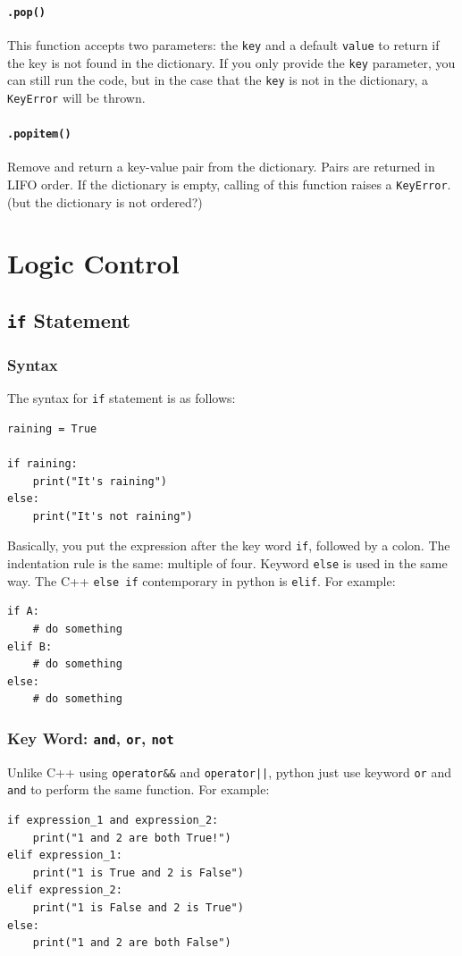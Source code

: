 \documentclass[12pt]{book}
\begin{document}
\subsubsection{\texttt{.pop()}}
\label{sec:orgbbf2fce}
This function accepts two parameters: the \texttt{key} and a default \texttt{value} to return if the key is not found in the dictionary. If you only provide the \texttt{key} parameter, you can still run the code, but in the case that the \texttt{key} is not in the dictionary, a \texttt{KeyError} will be thrown.
\subsubsection{\texttt{.popitem()}}
\label{sec:orgb8b19f4}
Remove and return a key-value pair from the dictionary. Pairs are returned in LIFO order. If the dictionary is empty, calling of this function raises a \texttt{KeyError}. (but the dictionary is not ordered?)

\chapter{Logic Control}
\label{sec:org02b6854}
\section{\texttt{if} Statement}
\label{sec:org691df47}
\subsection{Syntax}
\label{sec:orgf0bd111}
The syntax for \texttt{if} statement is as follows:
\begin{verbatim}
raining = True

if raining:
    print("It's raining")
else:
    print("It's not raining")
\end{verbatim}
Basically, you put the expression after the key word \texttt{if}, followed by a colon. The indentation rule is the same: multiple of four. Keyword \texttt{else} is used in the same way. The C++ \texttt{else if} contemporary in python is \texttt{elif}. For example:
\begin{verbatim}
if A:
    # do something
elif B:
    # do something
else:
    # do something
\end{verbatim}
\subsection{Key Word: \texttt{and}, \texttt{or}, \texttt{not}}
\label{sec:orgf3c707c}
Unlike C++ using \texttt{operator\&\&} and \texttt{operator||}, python just use keyword \texttt{or} and \texttt{and} to perform the same function. For example:
\begin{verbatim}
if expression_1 and expression_2:
    print("1 and 2 are both True!")
elif expression_1:
    print("1 is True and 2 is False")
elif expression_2:
    print("1 is False and 2 is True")
else:
    print("1 and 2 are both False")
\end{verbatim}
\end{document}
